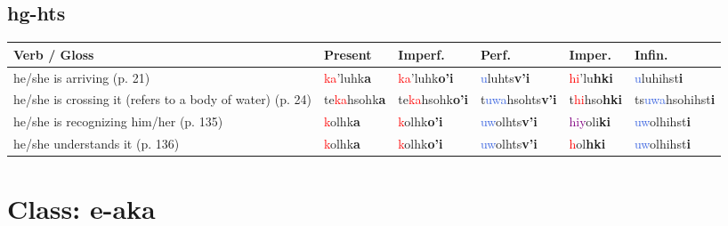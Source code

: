 \documentclass[oneside,openany]{book}%
\begin{document}
\subsection*{hg-hts}%
\begin{tabularx}{\textwidth}{>{\hsize=1.5\hsize\RaggedRight}X >{\hsize=0.9\hsize}X >{\hsize=0.9\hsize}X >{\hsize=0.9\hsize}X >{\hsize=0.9\hsize}X >{\hsize=0.9\hsize}X}%
\toprule%
\textbf{Verb / Gloss}&\textbf{Present}&\textbf{Imperf.}&\textbf{Perf.}&\textbf{Imper.}&\textbf{Infin.}\\%
\midrule%
he/she is arriving (p. 21)&\textcolor{Red}{ka}'luhk\textbf{a}&\textcolor{Red}{ka}'luhk\textbf{o'i}&\textcolor{RoyalBlue}{u}luhts\textbf{v'i}&\textcolor{Red}{hi}'lu\textbf{hki}&\textcolor{RoyalBlue}{u}luhihst\textbf{i}\\%
he/she is crossing it (refers to a body of water) (p. 24)&te\textcolor{Red}{ka}hsohk\textbf{a}&te\textcolor{Red}{ka}hsohk\textbf{o'i}&t\textcolor{RoyalBlue}{uwa}hsohts\textbf{v'i}&t\textcolor{Red}{hi}hso\textbf{hki}&ts\textcolor{RoyalBlue}{uwa}hsohihst\textbf{i}\\%
he/she is recognizing him/her (p. 135)&\textcolor{Red}{k}olhk\textbf{a}&\textcolor{Red}{k}olhk\textbf{o'i}&\textcolor{RoyalBlue}{uw}olhts\textbf{v'i}&\textcolor{Purple}{hiy}oli\textbf{ki}&\textcolor{RoyalBlue}{uw}olhihst\textbf{i}\\%
he/she understands it (p. 136)&\textcolor{Red}{k}olhk\textbf{a}&\textcolor{Red}{k}olhk\textbf{o'i}&\textcolor{RoyalBlue}{uw}olhts\textbf{v'i}&\textcolor{Red}{h}ol\textbf{hki}&\textcolor{RoyalBlue}{uw}olhihst\textbf{i}\\%
\bottomrule%
\end{tabularx}%
\vspace{1em}%
\needspace{3in}%
\section*{Class: e-aka}%
%
\needspace{1in}%
\end{document}
